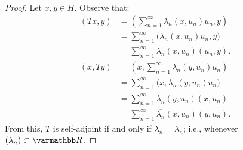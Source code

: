 \documentclass[10pt,oneside,openany]{memoir}
\begin{document}
\begin{proof}
    Let $x,y \in H$. Observe that:
        \begin{equation*}
        \begin{split}
            \left( Tx, y \right)
            & = \left( \sum_{n = 1}^\infty \lambda_n (x,u_n)u_n, y \right) \\
            & = \sum_{n = 1}^\infty \bigl(\lambda_n (x,u_n)u_n,y\bigr) \\
            & = \sum_{n = 1}^\infty \lambda_n (x,u_n)(u_n,y).
        \end{split}
        \end{equation*}
        \begin{equation*}
        \begin{split}
            (x,Ty)
            & = \left( x,\sum_{n = 1}^\infty \lambda_n (y,u_n)u_n \right) \\
            & = \sum_{n = 1}^\infty \bigl(x, \lambda_n (y,u_n)u_n\bigr) \\
            & = \sum_{n = 1}^\infty \overline{\lambda_n (y,u_n)}(x,u_n) \\
            & = \sum_{n = 1}^\infty \overline{\lambda_n}(x,u_n)(y,u_n).
        \end{split}
        \end{equation*}
    From this, $T$ is self-adjoint if and only if $\lambda_n = \overline{\lambda_n}$; i.e., whenever $(\lambda_n) \subset \bfR$.
\end{proof}
\end{document}
